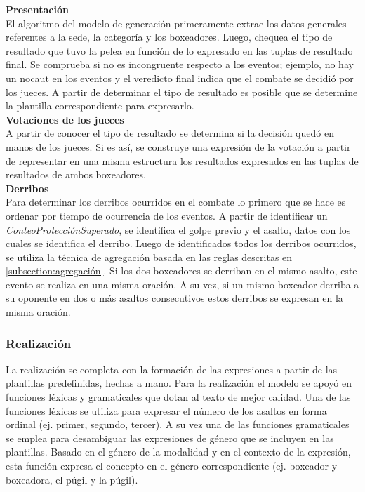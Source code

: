     \textbf{Presentación}\\

    El algoritmo del modelo de generación primeramente extrae los datos generales referentes a la sede, la categoría y los 
boxeadores. Luego, chequea el tipo de resultado que tuvo la pelea en función de lo expresado en las tuplas de resultado final.
Se comprueba si no es incongruente respecto a los eventos; ejemplo, no hay un nocaut en los eventos y el veredicto final indica que el 
combate se decidió por los jueces. A partir de determinar el tipo de resultado es posible que se determine la plantilla correspondiente para 
expresarlo.\\

    \textbf{Votaciones de los jueces}\\

    A partir de conocer el tipo de resultado se determina si la decisión quedó en manos de los jueces. Si es así, se construye una expresión 
de la votación a partir de representar en una misma estructura los resultados expresados en las tuplas de resultados de 
ambos boxeadores.\\

    \textbf{Derribos}\\

    Para determinar los derribos ocurridos en el combate lo primero que se hace es ordenar por tiempo de 
ocurrencia de los eventos. A partir de identificar un \textit{ConteoProtecciónSuperado}, se identifica el golpe previo y el asalto, 
datos con los cuales se identifica el derribo. Luego de identificados todos los derribos ocurridos, se utiliza la técnica de agregación 
basada en las reglas descritas en \ref{subsection:agregación}. Si los dos boxeadores se derriban en el mismo asalto, este evento se realiza en 
una misma oración. A su vez, si un mismo boxeador derriba a su oponente en dos o más asaltos consecutivos estos derribos se expresan en la misma 
oración.


\subsubsection{Realización}

    La realización se completa con la formación de las expresiones a partir de las plantillas predefinidas, hechas a mano. Para la 
realización el modelo se apoyó en funciones léxicas y gramaticales que dotan al texto de mejor calidad. Una de las funciones léxicas se utiliza 
para expresar el número de los asaltos en forma ordinal (ej. primer, segundo, tercer). A su vez una de las funciones gramaticales se emplea para
desambiguar las expresiones de género que se incluyen en las plantillas. Basado en el género de la modalidad y en el contexto de la expresión, esta función expresa el concepto 
en el género correspondiente (ej. boxeador y boxeadora, el púgil y la púgil). 


